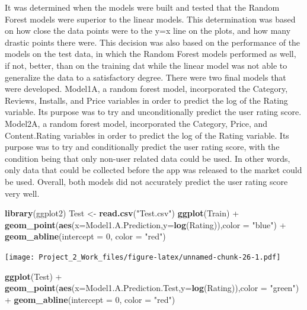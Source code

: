 \documentclass[]{article}
\newenvironment{Shaded}{\begin{snugshade}}{\end{snugshade}}
\newcommand{\KeywordTok}[1]{\textcolor[rgb]{0.13,0.29,0.53}{\textbf{{#1}}}}
\newcommand{\DataTypeTok}[1]{\textcolor[rgb]{0.13,0.29,0.53}{{#1}}}
\newcommand{\DecValTok}[1]{\textcolor[rgb]{0.00,0.00,0.81}{{#1}}}
\newcommand{\StringTok}[1]{\textcolor[rgb]{0.31,0.60,0.02}{{#1}}}
\newcommand{\NormalTok}[1]{{#1}}
\begin{document}
It was determined when the models were built and tested that the Random
Forest models were superior to the linear models. This determination was
based on how close the data points were to the y=x line on the plots,
and how many drastic points there were. This decision was also based on
the performance of the models on the test data, in which the Random
Forest models performed as well, if not, better, than on the training
dat while the linear model was not able to generalize the data to a
satisfactory degree. There were two final models that were developed.
Model1A, a random forest model, incorporated the Category, Reviews,
Installs, and Price variables in order to predict the log of the Rating
variable. Its purpose was to try and unconditionally predict the user
rating score. Model2A, a random forest model, incorporated the Category,
Price, and Content.Rating variables in order to predict the log of the
Rating variable. Its purpose was to try and conditionally predict the
user rating score, with the condition being that only non-user related
data could be used. In other words, only data that could be collected
before the app was released to the market could be used. Overall, both
models did not accurately predict the user rating score very well.

\begin{Shaded}
\begin{Highlighting}[]
\KeywordTok{library}\NormalTok{(ggplot2)}
\NormalTok{Test <-}\StringTok{ }\KeywordTok{read.csv}\NormalTok{(}\StringTok{"Test.csv"}\NormalTok{)}
\KeywordTok{ggplot}\NormalTok{(Train) +}\StringTok{ }\KeywordTok{geom_point}\NormalTok{(}\KeywordTok{aes}\NormalTok{(}\DataTypeTok{x=}\NormalTok{Model1.A.Prediction,}\DataTypeTok{y=}\KeywordTok{log}\NormalTok{(Rating)),}\DataTypeTok{color =} \StringTok{"blue"}\NormalTok{) +}
\StringTok{  }\KeywordTok{geom_abline}\NormalTok{(}\DataTypeTok{intercept =} \DecValTok{0}\NormalTok{, }\DataTypeTok{color =} \StringTok{"red"}\NormalTok{)}
\end{Highlighting}
\end{Shaded}

\texttt{[image: Project\_2\_Work\_files/figure-latex/unnamed-chunk-26-1.pdf]}

\begin{Shaded}
\begin{Highlighting}[]
\KeywordTok{ggplot}\NormalTok{(Test) +}\StringTok{ }\KeywordTok{geom_point}\NormalTok{(}\KeywordTok{aes}\NormalTok{(}\DataTypeTok{x=}\NormalTok{Model1.A.Prediction.Test,}\DataTypeTok{y=}\KeywordTok{log}\NormalTok{(Rating)),}\DataTypeTok{color =} \StringTok{"green"}\NormalTok{) +}
\StringTok{  }\KeywordTok{geom_abline}\NormalTok{(}\DataTypeTok{intercept =} \DecValTok{0}\NormalTok{, }\DataTypeTok{color =} \StringTok{"red"}\NormalTok{)}
\end{Highlighting}
\end{Shaded}
\end{document}
